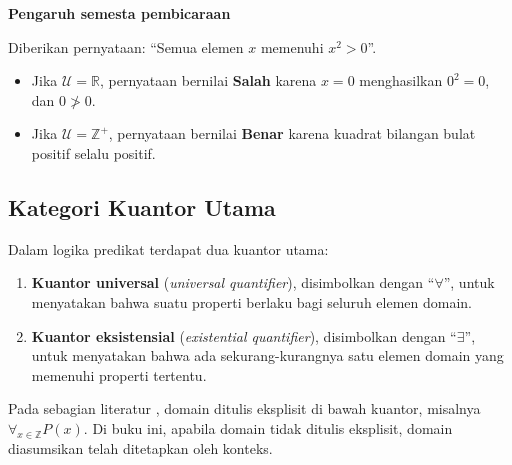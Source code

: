 \begin{contoh}
\textbf{Pengaruh semesta pembicaraan}

Diberikan pernyataan: ``Semua elemen $x$ memenuhi $x^2 > 0$''.
\begin{itemize}
    \item Jika $\mathcal{U} = \mathbb{R}$, pernyataan bernilai \textbf{Salah} karena $x=0$ menghasilkan $0^2=0$, dan $0 \not> 0$.
    \item Jika $\mathcal{U} = \mathbb{Z}^+$, pernyataan bernilai \textbf{Benar} karena kuadrat bilangan bulat positif selalu positif.
\end{itemize}
\end{contoh}

\subsection{Kategori Kuantor Utama}

Dalam logika predikat terdapat dua kuantor utama:
\begin{enumerate}
    \item \textbf{Kuantor universal} (\textit{universal quantifier}), disimbolkan dengan ``$\forall$'', untuk menyatakan bahwa suatu properti berlaku bagi seluruh elemen domain.
    \item \textbf{Kuantor eksistensial} (\textit{existential quantifier}), disimbolkan dengan ``$\exists$'', untuk menyatakan bahwa ada sekurang-kurangnya satu elemen domain yang memenuhi properti tertentu.
\end{enumerate}

Pada sebagian literatur \cite{wiki_quantifier_logic}, domain ditulis eksplisit di bawah kuantor, misalnya $\forall_{x \in \mathbb{Z}} P(x)$. Di buku ini, apabila domain tidak ditulis eksplisit, domain diasumsikan telah ditetapkan oleh konteks.
